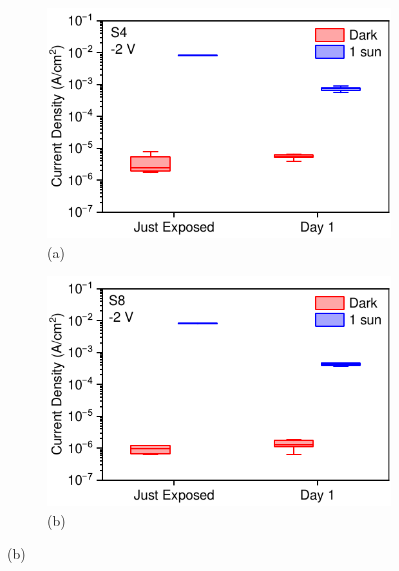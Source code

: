 \begin{figure}[htbp]
    \centering
    \begin{subfigure}[t]{0.49\textwidth}
        \centering
        \includegraphics[width=\textwidth]{chapters/stability/imeges/AP44_6_Thesis.pdf} %
        \caption*{(a)}
    \end{subfigure}
    \hfill
    \begin{subfigure}[t]{0.49\textwidth}
        \centering
        \includegraphics[width=\textwidth]{chapters/stability/imeges/AP44_8_Thesis.pdf} %
        \caption*{(b)}
    \end{subfigure}



\end{figure}
